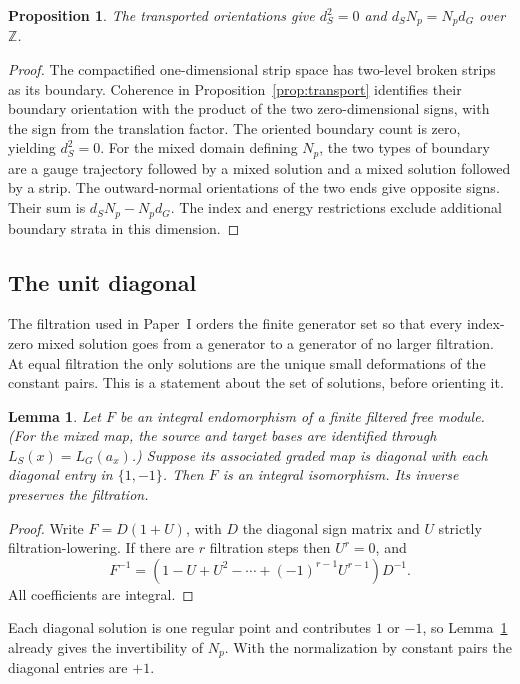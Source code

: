 \documentclass[11pt]{amsart}
\newtheorem{proposition}[theorem]{Proposition}
\newtheorem{lemma}[theorem]{Lemma}
\theoremstyle{definition}
\theoremstyle{remark}
\theoremstyle{plain}
\numberwithin{equation}{section}
\newcommand{\ZZ}{\mathbb Z}
\begin{document}
\begin{proposition}\label{prop:N-chain}
The transported orientations give
$d_S^2=0$ and $d_SN_p=N_pd_G$ over $\ZZ$.
\end{proposition}
\begin{proof}
The compactified one-dimensional strip space has two-level
broken strips as its boundary. Coherence in
Proposition~\ref{prop:transport} identifies their boundary
orientation with the product of the two zero-dimensional
signs, with the sign from the translation factor. The
oriented boundary count is zero, yielding $d_S^2=0$.
For the mixed domain defining $N_p$, the two types of boundary are a
gauge trajectory followed by a mixed solution and a mixed
solution followed by a strip. The outward-normal
orientations of the two ends give opposite signs. Their
sum is $d_SN_p-N_pd_G$. The index and energy restrictions
exclude additional boundary strata in this dimension.
\end{proof}

\subsection{The unit diagonal}
The filtration used in Paper~I orders the finite generator
set so that every index-zero mixed solution goes from a
generator to a generator of no larger filtration. At equal
filtration the only solutions are the unique small
deformations of the constant pairs. This is a statement
about the set of solutions, before orienting it.

\begin{lemma}\label{lem:triangular}
Let $F$ be an integral endomorphism of a finite filtered
free module. (For the mixed map, the source and target bases are
identified through $L_S(x)=L_G(a_x)$.) Suppose its associated graded map is diagonal
with each diagonal entry in $\{1,-1\}$. Then $F$ is an
integral isomorphism. Its inverse preserves the filtration.
\end{lemma}
\begin{proof}
Write $F=D(1+U)$, with $D$ the diagonal sign matrix and
$U$ strictly filtration-lowering. If there are $r$
filtration steps then $U^r=0$, and
\[
 F^{-1}=(1-U+U^2-\cdots+(-1)^{r-1}U^{r-1})D^{-1}.
\]
All coefficients are integral.
\end{proof}

Each diagonal solution is one regular point and contributes $1$ or
$-1$, so Lemma~\ref{lem:triangular} already gives the invertibility
of $N_p$. With the normalization by constant pairs the diagonal
entries are $+1$.
\end{document}
